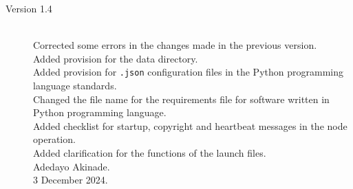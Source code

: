 \documentclass{CSSRforAfrica}
\begin{document}
\begin{description}
 
\item [Version 1.4]~\\
Corrected some errors in the changes made in the previous version.\\     
Added provision for the data directory. \\
Added provision for {\small \texttt{.json}} configuration files in the Python programming language standards. \\
Changed the file name for the requirements file for software written in Python programming language. \\
Added checklist for startup, copyright and heartbeat messages in the node operation. \\
Added clarification for the functions of the launch files. \\
Adedayo Akinade. \\       
3 December 2024. 

\end{description}
\end{document}
